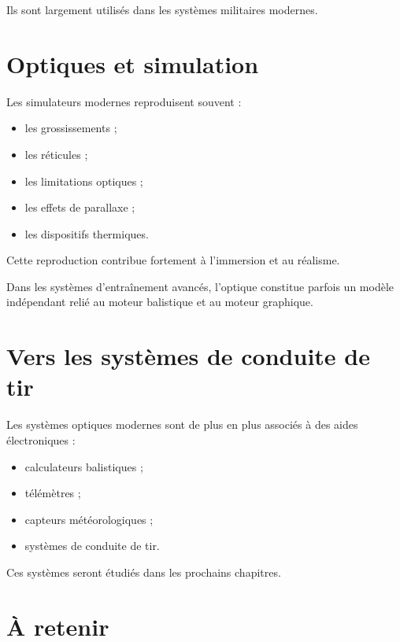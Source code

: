 Ils sont largement utilisés dans les systèmes militaires modernes.

\section{Optiques et simulation}

Les simulateurs modernes reproduisent souvent :

\begin{itemize}
    \item les grossissements ;
    \item les réticules ;
    \item les limitations optiques ;
    \item les effets de parallaxe ;
    \item les dispositifs thermiques.
\end{itemize}

Cette reproduction contribue fortement à l'immersion et au réalisme.

\begin{simulation}

Dans les systèmes d'entraînement avancés, l'optique constitue parfois un
modèle indépendant relié au moteur balistique et au moteur graphique.

\end{simulation}

\section{Vers les systèmes de conduite de tir}

Les systèmes optiques modernes sont de plus en plus associés à des aides
électroniques :

\begin{itemize}
    \item calculateurs balistiques ;
    \item télémètres ;
    \item capteurs météorologiques ;
    \item systèmes de conduite de tir.
\end{itemize}

Ces systèmes seront étudiés dans les prochains chapitres.

\section{À retenir}

